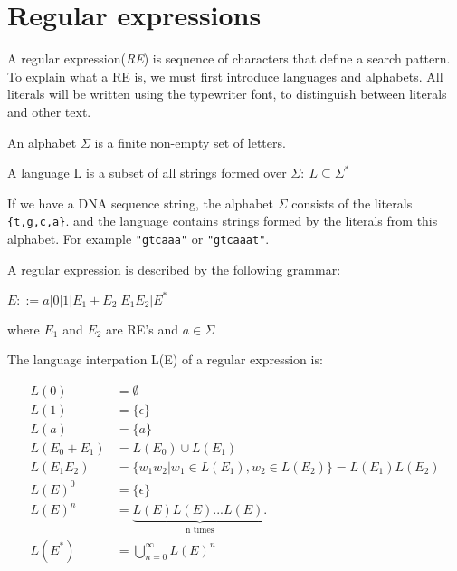 \section{Regular expressions} 
A regular expression(\emph{RE}) is sequence of characters that define a search pattern. To explain what a RE  is, we must first introduce languages and alphabets. All literals will be written using the typewriter font, to distinguish between literals and other text. 
\begin{mydef}\label{alph}
An alphabet $\Sigma$ is a finite non-empty set of letters.
\end{mydef}

\begin{mydef}\label{lang}
A language L is a subset of all strings formed over $\Sigma:~ L\subseteq \Sigma^*$
\end{mydef}

\begin{myex}\label{reex}
If we have a DNA sequence string, the alphabet $\Sigma$ consists of the literals {\tt\{t,g,c,a\}}. and the language contains strings formed by the literals from this alphabet. For example {\tt "gtcaaa"} or  {\tt "gtcaaat"}. 
\end{myex}


\begin{mydef}
A regular expression is described by the following grammar: \\
\begin{center}
$E::= a|0|1|E_1 + E_2 |E_1 E_2 | E^*$
\end{center}
where $E_1$ and $E_2$ are RE's and $a \in \Sigma$
\end{mydef}

\begin{mydef}\label{re}
The language interpation L(E) of a regular expression is: 
\begin{center}
\begin{align*}
L(0)           &= \emptyset\\
L(1)         &= \{\epsilon\} \\
L(a)     &= \{a\} \\
L(E_0 + E_1) &= L(E_0) \cup L(E_1) \\
L(E_1 E_2)   &= \{w_1w_2 | w_1 \in L(E_1),w_2 \in L(E_2)\}=L(E_1)L(E_2) \\
L(E)^0       &= \{\epsilon\}\\
L(E)^n       &= \underbrace{L(E)L(E)...L(E).}_\text{n times}\\
L(E^*)       &= \bigcup\limits_{n=0}^\infty L(E)^n 
\end{align*}
\end{center}
\cite[p.5 def. 3]{crash}
\end{mydef}

